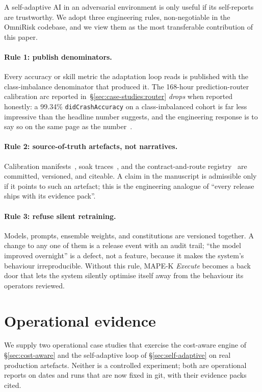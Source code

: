 \documentclass[11pt,a4paper]{article}
\begin{document}
A self-adaptive AI in an adversarial environment is only useful if its
self-reports are trustworthy. We adopt three engineering rules,
non-negotiable in the OmniRisk codebase, and we view them as the most
transferable contribution of this paper.

\paragraph{Rule 1: publish denominators.} Every accuracy or skill metric
the adaptation loop reads is published with the class-imbalance
denominator that produced it. The 168-hour prediction-router calibration
arc reported in~\S\ref{sec:case-studies:router} \emph{drops} when
reported honestly: a 99.34\% \texttt{didCrashAccuracy} on a class-imbalanced
cohort is far less impressive than the headline number suggests, and the
engineering response is to say so on the same page as the
number~\cite{omnirisk2026predmetrics}.

\paragraph{Rule 2: source-of-truth artefacts, not narratives.}
Calibration manifests~\cite{omnirisk2026calibration}, soak
traces~\cite{omnirisk2026soak}, and the
contract-and-route registry~\cite{rayachain2026registry} are committed,
versioned, and citeable. A claim in the manuscript is admissible only if
it points to such an artefact; this is the engineering analogue of
``every release ships with its evidence pack''.

\paragraph{Rule 3: refuse silent retraining.} Models, prompts, ensemble
weights, and constitutions are versioned together. A change to any one
of them is a release event with an audit trail; ``the model improved
overnight'' is a defect, not a feature, because it makes the system's
behaviour irreproducible. Without this rule, MAPE-K \emph{Execute}
becomes a back door that lets the system silently optimise itself away
from the behaviour its operators reviewed.

\section{Operational evidence}\label{sec:case-studies}

We supply two operational case studies that exercise the cost-aware
engine of \S\ref{sec:cost-aware} and the self-adaptive loop of
\S\ref{sec:self-adaptive} on real production artefacts. Neither is a
controlled experiment; both are operational reports on dates and runs
that are now fixed in git, with their evidence packs cited.
\end{document}
